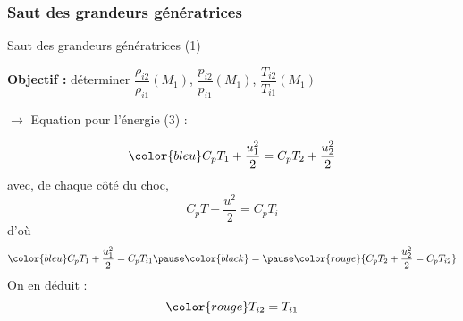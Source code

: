 \subsubsection{Saut des grandeurs génératrices}
\begin{frame}{Saut des grandeurs génératrices (1)}

\small

\textbf{Objectif :} 
déterminer $\dfrac{\rho_{i2}}{\rho_{i1}}(M_1)$, 
$\dfrac{p_{i2}}{p_{i1}}(M_1)$, $\dfrac{T_{i2}}{T_{i1}}(M_1)$

\bigskip

$\rightarrow$ Equation pour l'énergie (3) : 

\[ \color{bleu}
	C_p T_1 + \dfrac{u_1^2}{2} = C_p T_2 + \dfrac{u_2^2}{2}
\]
\pause
avec, de chaque côté du choc,
\[
C_p T + \dfrac{u^2}{2} = C_p T_i
\]
\pause
d'où
\[
	\color{bleu} C_p T_1 + \dfrac{u_1^2}{2} = C_p T_{i1} \pause
	\color{black} = \pause
	\color{rouge}{C_p T_2 + \dfrac{u_2^2}{2} = C_p T_{i2}}
\]	
\pause
On en déduit :
\begin{equation}
	\color{rouge}
	T_{i2} = T_{i1}
\end{equation}

\vspace{20mm}

\end{frame}

